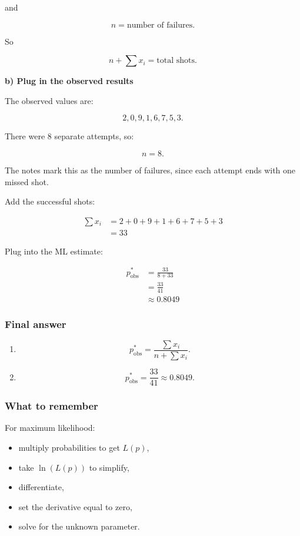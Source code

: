 \documentclass[10pt]{article}
\begin{document}
and

\[
n
= \text{number of failures}.
\]

So

\[
n+\sum x_i
= \text{total shots}.
\]

\RepeatedQuestion{\uppgiftFiveQuestion}
\textbf{b) Plug in the observed results}

The observed values are:

\[
2,0,9,1,6,7,5,3.
\]

There were 8 separate attempts, so:

\[
n=8.
\]

The notes mark this as the number of failures, since each attempt
ends with one missed shot.

Add the successful shots:

\begin{align*}
\sum x_i
&=
2+0+9+1+6+7+5+3 \\[2mm]
&=33
\end{align*}

Plug into the ML estimate:

\begin{align*}
p^*_{\mathrm{obs}}
&=
\frac{33}{8+33} \\[2mm]
&=
\frac{33}{41} \\[2mm]
&\approx 0.8049
\end{align*}

\subsubsection*{Final answer}
\begin{enumerate}[label=\alph*)]
\item
\[
p^*_{\mathrm{obs}}
=
\frac{\sum x_i}
{n+\sum x_i}.
\]

\item
\[
p^*_{\mathrm{obs}}
=
\frac{33}{41}
\approx 0.8049.
\]
\end{enumerate}

\subsubsection*{What to remember}
For maximum likelihood:

\begin{itemize}
\item multiply probabilities to get $L(p)$,
\item take $\ln(L(p))$ to simplify,
\item differentiate,
\item set the derivative equal to zero,
\item solve for the unknown parameter.
\end{itemize}
\end{document}
